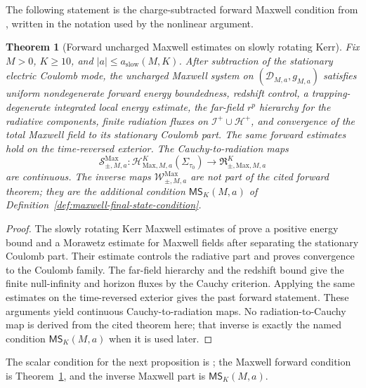 \documentclass[11pt]{article}
\numberwithin{equation}{section}
\theoremstyle{plain}
\newtheorem{theorem}{Theorem}[section]
\theoremstyle{definition}
\theoremstyle{remark}
\newcommand{\MScat}{\mathsf{MS}}
\begin{document}
The following statement is the charge-subtracted forward Maxwell condition from \cite{AnderssonBlueMaxwellSlowKerr}, written in the notation used by the nonlinear argument.

\begin{theorem}[Forward uncharged Maxwell estimates on slowly rotating Kerr]\label{thm:maxwell-scattering-kerr}
Fix \(M>0\), \(K\ge10\), and \(|a|\le a_{\mathrm{slow}}(M,K)\).  After subtraction of the stationary electric Coulomb mode, the uncharged Maxwell system on \((\mathcal D_{M,a},g_{M,a})\) satisfies uniform nondegenerate forward energy boundedness, redshift control, a trapping-degenerate integrated local energy estimate, the far-field \(r^p\) hierarchy for the radiative components, finite radiation fluxes on \(\mathcal I^+\cup\mathcal H^+\), and convergence of the total Maxwell field to its stationary Coulomb part.  The same forward estimates hold on the time-reversed exterior.  The Cauchy-to-radiation maps
\begin{equation}
 \mathscr S_{\pm,M,a}^{\mathrm{Max}}:
 \mathcal H_{\mathrm{Max},M,a}^{K}(\Sigma_{\tau_0})
 \longrightarrow
 \mathfrak R_{\pm,\mathrm{Max},M,a}^{K}
\end{equation}
are continuous.  The inverse maps \(\mathscr W_{\pm,M,a}^{\mathrm{Max}}\) are not part of the cited forward theorem; they are the additional condition \(\MScat_K(M,a)\) of Definition~\ref{def:maxwell-final-state-condition}.
\end{theorem}

\begin{proof}
The slowly rotating Kerr Maxwell estimates of \cite{AnderssonBlueMaxwellSlowKerr} prove a positive energy bound and a Morawetz estimate for Maxwell fields after separating the stationary Coulomb part.  Their estimate controls the radiative part and proves convergence to the Coulomb family.  The far-field hierarchy and the redshift bound give the finite null-infinity and horizon fluxes by the Cauchy criterion.  Applying the same estimates on the time-reversed exterior gives the past forward statement.  These arguments yield continuous Cauchy-to-radiation maps.  No radiation-to-Cauchy map is derived from the cited theorem here; that inverse is exactly the named condition \(\MScat_K(M,a)\) when it is used later.
\end{proof}

The scalar condition for the next proposition is \cite{DRSRKerr,DRSRKerrIII}; the Maxwell forward condition is Theorem~\ref{thm:maxwell-scattering-kerr}, and the inverse Maxwell part is \(\MScat_K(M,a)\).
\end{document}
